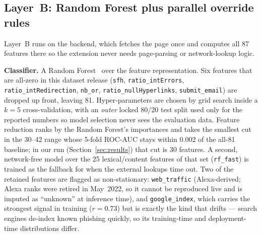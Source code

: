 \documentclass[conference]{IEEEtran}
\begin{document}
\subsection{Layer~B: Random Forest plus parallel override rules}
\label{sec:arch-b}
Layer~B runs on the backend, which fetches the page once and computes all 87
features there so the extension never needs page-parsing or network-lookup logic.

\textbf{Classifier.} A Random Forest~\cite{breiman2001rf} over the feature
representation. Six features that are all-zero in this dataset release
(\texttt{sfh}, \texttt{ratio\_intErrors}, \texttt{ratio\_intRedirection},
\texttt{nb\_or}, \texttt{ratio\_nullHyperlinks}, \texttt{submit\_email}) are
dropped up front, leaving 81. Hyper-parameters are chosen by grid search inside a
$k=5$ cross-validation, with an \emph{outer} locked 80/20 test split used only for
the reported numbers so model selection never sees the evaluation data. Feature
reduction ranks by the Random Forest's importances and takes the smallest cut in
the 30--42 range whose 5-fold ROC-AUC stays within 0.002 of the all-81 baseline;
in our run (Section~\ref{sec:results}) that cut is 30 features. A second,
network-free model over the 25 lexical/content features of that set
(\texttt{rf\_fast}) is trained as the fallback for when the external lookups
time out. Two of the retained features are flagged as non-stationary:
\texttt{web\_traffic} (Alexa-derived; Alexa ranks were retired in May~2022, so it
cannot be reproduced live and is imputed as ``unknown'' at inference time), and
\texttt{google\_index}, which carries the strongest signal in training
($r=0.73$) but is exactly the kind that drifts --- search engines de-index known
phishing quickly, so its training-time and deployment-time distributions differ.
\end{document}

